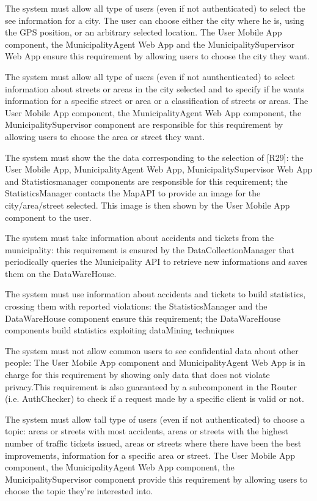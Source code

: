 \documentclass[a4paper]{report}
\begin{document}
\begin{enumerate}[start=1,label={[R\arabic*]}]
\item The system must allow all type of users (even if not authenticated) to select the see information for a city. The user can choose either the city where he is, using the GPS position, or an arbitrary selected location. The User Mobile App component, the MunicipalityAgent Web App and the MunicipalitySupervisor Web App ensure this requirement by allowing users to choose the city they want.
\item The system must allow all type of users (even if not aunthenticated) to select information about streets or areas in the city selected and to specify if he wants information for a specific street or area or a classification of streets or areas. The User Mobile App component, the MunicipalityAgent Web App component, the MunicipalitySupervisor component are responsible for this requirement by allowing users to choose the area or street they want.
\item The system must show the the data corresponding to the selection of [R29]: the User Mobile App, MunicipalityAgent Web App, MunicipalitySupervisor Web App and Statisticsmanager components are responsible for this requirement; the StatisticsManager contacts the MapAPI to provide an image for the city/area/street selected. This image is then shown by the User Mobile App component to the user.
\item The system must take information about accidents and tickets from the municipality: this requirement is ensured by the DataCollectionManager that periodically queries the Municipality API to retrieve new informations and saves them on the DataWareHouse.
\item The system must use information  about accidents and tickets to build statistics, crossing them with reported violations: the StatisticsManager and the DataWareHouse component ensure this requirement; the DataWareHouse components build statistics exploiting dataMining techniques
\item The system must not allow common users to see confidential data about other people: The User Mobile App component and MunicipalityAgent Web App is in charge for this requirement by showing only data that does not violate privacy.This requirement is also guaranteed by a subcomponent in the Router (i.e. AuthChecker) to check if a request made by a specific client is valid or not.
\item The system must allow tall type of users (even if not authenticated) to choose a topic: areas or streets with most accidents, areas or streets with the highest number of traffic tickets issued, areas or streets where there have been the best improvements, information for a specific area or street. The User Mobile App component, the MunicipalityAgent Web App component, the MunicipalitySupervisor component provide this requirement by allowing users to choose the topic they're interested into.

\end{enumerate}
\end{document}
